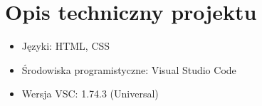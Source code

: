 \documentclass[12pt, letterpaper]{article}
\begin{document}
\section{Opis techniczny projektu}
\begin{itemize}
\item Języki: HTML, CSS
\item Środowiska programistyczne: Visual Studio Code
\item Wersja VSC: 1.74.3 (Universal)
\end{itemize}
\end{document}
